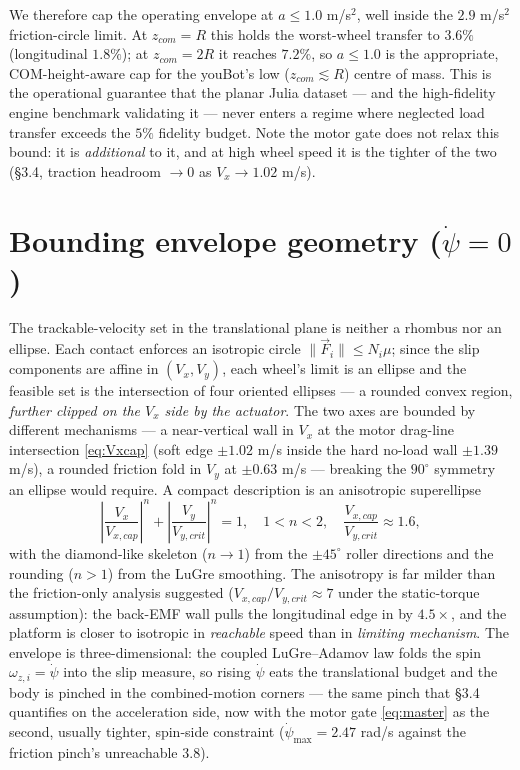 \documentclass[11pt]{article}
\begin{document}
We therefore cap the operating envelope at $a\le1.0$ m/s$^2$, well inside the
$2.9$ m/s$^2$ friction-circle limit. At $z_{com}=R$ this holds the worst-wheel
transfer to $3.6\%$ (longitudinal $1.8\%$); at $z_{com}=2R$ it reaches $7.2\%$, so
$a\le1.0$ is the appropriate, COM-height-aware cap for the youBot's low
($z_{com}\!\lesssim\!R$) centre of mass. This is the operational guarantee that
the planar Julia dataset --- and the high-fidelity engine benchmark validating it
--- never enters a regime where neglected load transfer exceeds the $5\%$
fidelity budget. Note the motor gate does not relax this bound: it is
\emph{additional} to it, and at high wheel speed it is the tighter of the two
(\S3.4, traction headroom $\to0$ as $V_x\to1.02$ m/s).

\section{Bounding envelope geometry ($\dot\psi=0$)}
The trackable-velocity set in the translational plane is neither a rhombus nor an ellipse. Each
contact enforces an isotropic circle $\|\vec F_i\|\le N_i\mu$; since the slip components are affine
in $(V_x,V_y)$, each wheel's limit is an ellipse and the feasible set is the intersection of four
oriented ellipses --- a rounded convex region, \emph{further clipped on the $V_x$ side by the
actuator}. The two axes are bounded by different mechanisms ---
a near-vertical wall in $V_x$ at the motor drag-line intersection \eqref{eq:Vxcap} (soft edge
$\pm1.02$ m/s inside the hard no-load wall $\pm1.39$ m/s), a rounded friction fold in $V_y$ at
$\pm0.63$ m/s --- breaking the $90^\circ$ symmetry an ellipse would require. A compact description
is an anisotropic superellipse
\begin{equation}
\left|\frac{V_x}{V_{x,cap}}\right|^n+\left|\frac{V_y}{V_{y,crit}}\right|^n=1,\quad1<n<2,\quad
\frac{V_{x,cap}}{V_{y,crit}}\approx1.6,
\end{equation}
with the diamond-like skeleton ($n\to1$) from the $\pm45^\circ$ roller directions and the rounding
($n>1$) from the LuGre smoothing. The anisotropy is far milder than the friction-only analysis
suggested ($V_{x,cap}/V_{y,crit}\approx7$ under the static-torque assumption): the back-EMF wall
pulls the longitudinal edge in by $4.5\times$, and the platform is closer to isotropic in
\emph{reachable} speed than in \emph{limiting mechanism}. The envelope is three-dimensional: the
coupled LuGre--Adamov law folds the spin $\omega_{z,i}=\dot\psi$ into the slip measure, so rising
$\dot\psi$ eats the translational budget and the body is pinched in the combined-motion corners ---
the same pinch that \S3.4 quantifies on the acceleration side, now with the motor gate
\eqref{eq:master} as the second, usually tighter, spin-side constraint
($\dot\psi_{\max}=2.47$ rad/s against the friction pinch's unreachable 3.8).
\end{document}
